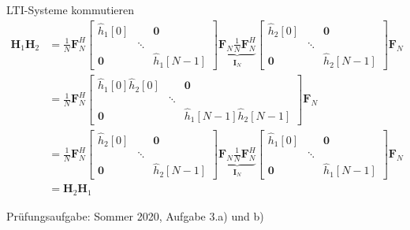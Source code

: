 \documentclass[14pt, aspectratio=169, handout]{beamer}
\begin{document}
\begin{frame}{LTI-Systeme kommutieren}
\small{
    \begin{align*}
    \mathbf{H}_1 \mathbf{H}_2 &= \frac{1}{N} \mathbf{F}_N^H \begin{bmatrix}
        \hat{h}_1[0] & & \mathbf{0} \\
        & \ddots & \\
        \mathbf{0} & & \hat{h}_1[N-1]
    \end{bmatrix} \underbrace{\mathbf{F}_N \frac{1}{N} \mathbf{F}_N^H}_{\mathbf{I}_N}  \begin{bmatrix}
        \hat{h}_2[0] & & \mathbf{0} \\
        & \ddots & \\
        \mathbf{0} & & \hat{h}_2[N-1]
    \end{bmatrix}\mathbf{F}_N \\
    &= \frac{1}{N} \mathbf{F}_N^H \begin{bmatrix}
        \hat{h}_1[0]\hat{h}_2[0] & & \mathbf{0} \\
        & \ddots & \\
        \mathbf{0} & & \hat{h}_1[N-1]\hat{h}_2[N-1]
    \end{bmatrix}\mathbf{F}_N \\
    &= \frac{1}{N} \mathbf{F}_N^H \begin{bmatrix}
        \hat{h}_2[0] & & \mathbf{0} \\
        & \ddots & \\
        \mathbf{0} & & \hat{h}_2[N-1]
    \end{bmatrix} \underbrace{\mathbf{F}_N \frac{1}{N} \mathbf{F}_N^H}_{\mathbf{I}_N}  \begin{bmatrix}
        \hat{h}_1[0] & & \mathbf{0} \\
        & \ddots & \\
        \mathbf{0} & & \hat{h}_1[N-1]
    \end{bmatrix} \mathbf{F}_N \\
    &= \mathbf{H}_2 \mathbf{H}_1
\end{align*}}
\end{frame}

\begin{frame}{Prüfungsaufgabe: Sommer 2020, Aufgabe 3.a) und b)}
    
\end{frame}
\end{document}
